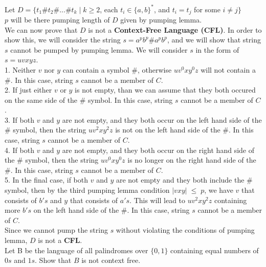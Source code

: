\documentclass[12pt]{article}
\begin{document}
Let $D = \{t_1 \# t_2 \# ... \# t_k \; | \; k \geq 2$, each $t_i \in \{a, b\}^*$, and $t_i = t_j$ for some $i \ne j \} $ \\
$p$ will be there pumping length of $D$ given by pumping lemma. \\

We can now prove that $D$ is not a \textbf{Context-Free Language (CFL)}.
In order to show this, we will consider the string $s = a^p b^p \# a^p b^p $,
and we will show that string $s$ cannot be pumped by pumping lemma. We will
consider $s$ in the form of $s = uvxyz$. \\

1. Neither $v$ nor $y$ can contain a symbol $\#$, otherwise $u v^0 x y^0 z$
will not contain a $\#$. In this case, string $s$ cannot be a member of $C$. \\

2. If just either $v$ or $y$ is not empty, than we can assume that they both occured
on the same side of the $\#$ symbol. In this case, string $s$ cannot be a member of $C$. \\

3. If both $v$ and $y$ are not empty, and they both occur on the left hand side
of the $\#$ symbol, then the string $u v^2 x y^2 z$ is not on the left hand
side of the $\#$. In this case, string $s$ cannot be a member of $C$. \\

4. If both $v$ and $y$ are not empty, and they both occur on the right hand side
of the $\#$ symbol, then the string $u v^0 x y^0 z$ is no longer on the
right hand side of the $\#$. In this case, string $s$ cannot be a member of $C$. \\

5. In the final case, if both $v$ and $y$ are not empty and they both include
the $\#$ symbol, then by the third pumping lemma condition $|vxy| \; \le \; p$,
we have $v$ that consists of $b's$ and $y$ that consists of $a's$. This will
lead to $u v^2 x y^2 z$ containing more $b's$ on the left hand side of the $\#$.
In this case, string $s$ cannot be a member of $C$. \\

Since we cannot pump the string $s$ without violating the conditions of
pumping lemma, $D$ is not a \textbf{CFL}. \\

 Let B be the language of all palindromes over $\{0, 1\}$ containing equal numbers of
$0s$ and $1s$. Show that $B$ is not context free. \\
\end{document}
